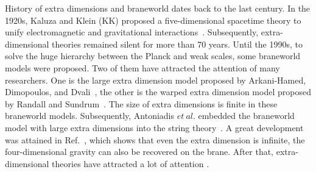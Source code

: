 History of extra dimensions and braneworld dates back to the last century. In the 1920s, Kaluza and Klein (KK) proposed a five-dimensional spacetime theory to unify electromagnetic and gravitational interactions~\cite{kaluza:1921un,Klein:1926tv}. Subsequently, extra-dimensional theories remained silent for more than 70 years. Until the 1990s, to solve the huge hierarchy between the Planck and weak scales, some braneworld models were proposed. Two of them have attracted the attention of many researchers. One is the large extra dimension model proposed by Arkani-Hamed, Dimopoulos, and Dvali~\cite{ArkaniHamed:1998rs}, the other is the warped extra dimension model proposed by Randall and Sundrum~\cite{Randall:1999ee}. The size of extra dimensions is finite in these braneworld models. Subsequently, Antoniadis $et~al.$ embedded the braneworld model with large extra dimensions into the string theory~\cite{Antoniadis:1998ig}. A great development was attained in Ref.~\cite{Randall:1999vf}, which shows that even the extra dimension is infinite, the four-dimensional gravity can also be recovered on the brane. After that, extra-dimensional theories have attracted a lot of attention \cite{Goldberger:1999uk,Gremm:1999pj,DeWolfe:1999cp,Csaki:2000fc,Bazeia:2008zx,Charmousis:2001hg,
Arias:2002ew,Barcelo:2003wq,Bazeia:2004dh,CastilloFelisola:2004eg,Kanno:2004nr,BarbosaCendejas:2005kn,
Koerber:2008rx,BarbosaCendejas:2007vp,Johnson:2008kc,Liu:2011wi,Chumbes:2011zt,Andrianov:2012ae,
Kulaxizi:2014yxa,Dutra:2014xla,Chakraborty:2015zxc,Karam:2018squ}.

